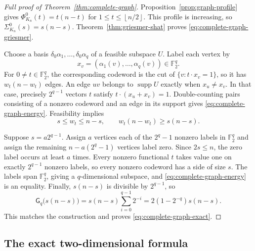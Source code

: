 \documentclass[11pt,letterpaper]{article}
\theoremstyle{plain}
\theoremstyle{definition}
\newcommand{\F}{\mathbb{F}_2}
\newcommand{\supp}{\operatorname{supp}}
\newcommand{\1}{\mathbf{1}}
\newcommand{\floor}[1]{\left\lfloor#1\right\rfloor}
\begin{document}
\begin{proof}[Full proof of Theorem~\ref{thm:complete-graph}]
Proposition~\ref{prop:graph-profile} gives
$\Phi_{K_n}^0(t)=t(n-t)$ for $1\le t\le\floor{n/2}$.  This profile is increasing, so
$\Sigma_{K_n}^0(s)=s(n-s)$.  Theorem~\ref{thm:griesmer-shat} proves
\eqref{eq:complete-graph-griesmer}.

Choose a basis $\delta_0\alpha_1,\ldots,\delta_0\alpha_q$ of a feasible subspace
$U$.  Label each vertex by
\[
 x_v=(\alpha_1(v),\ldots,\alpha_q(v))\in\F^q.
\]
For $0\ne t\in\F^q$, the corresponding codeword is the cut of
$\{v:t\cdot x_v=1\}$, so it has $w_t(n-w_t)$ edges.  An edge $uv$ belongs to
$\supp U$ exactly when $x_u\ne x_v$.  In that case, precisely $2^{q-1}$ vectors $t$
satisfy $t\cdot(x_u+x_v)=1$.  Double-counting pairs consisting of a nonzero codeword
and an edge in its support gives \eqref{eq:complete-graph-energy}.  Feasibility implies
\[
 s\le w_t\le n-s,
 \qquad
 w_t(n-w_t)\ge s(n-s).
\]

Suppose $s=a2^{q-1}$.  Assign $a$ vertices each of the $2^q-1$ nonzero labels in
$\F^q$ and assign the remaining $n-a(2^q-1)$ vertices label zero.  Since $2s\le n$,
the zero label occurs at least $a$ times.  Every nonzero functional $t$ takes value one
on exactly $2^{q-1}$ nonzero labels, so every nonzero codeword has a side of size $s$.
The labels span $\F^q$, giving a $q$-dimensional subspace, and
\eqref{eq:complete-graph-energy} is an equality.  Finally, $s(n-s)$ is divisible by
$2^{q-1}$, so
\[
 \mathsf G_q\bigl(s(n-s)\bigr)
 =s(n-s)\sum_{i=0}^{q-1}2^{-i}
 =2(1-2^{-q})s(n-s).
\]
This matches the construction and proves \eqref{eq:complete-graph-exact}.
\end{proof}

\subsection{The exact two-dimensional formula}
\label{app:q2-proof}
\end{document}
